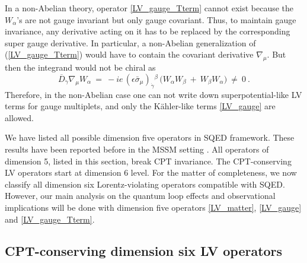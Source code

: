 \documentclass[12pt]{revtex4}
\begin{document}
In a non-Abelian theory, operator \eqref{LV_gauge_Tterm} cannot exist
because the $W_\alpha$'s are not gauge invariant but only gauge covariant.
Thus, to maintain gauge invariance, any derivative acting on it has to
be replaced by the corresponding super gauge derivative. 
In particular, a non-Abelian generalization of 
 (\ref{LV_gauge_Tterm}) would have to contain the covariant
derivative $\nabla_\mu$.  But then the integrand would not be chiral
as 
%
\begin{equation}
\overline{D}_{\dot\gamma} \nabla_\mu W_\alpha ~=~ 
-i e\, (\epsilon \bar\sigma_\mu)_{\dot\gamma}{}^\beta\, 
\Big( W_\alpha W_\beta ~+~ W_\beta W_\alpha \Big) ~\neq~ 0~. 
\end{equation} 
%
Therefore, in the non-Abelian case one can not write down
superpotential-like LV terms for gauge multiplets, and only 
the K\"ahler-like terms \eqref{LV_gauge} are allowed. 

We have listed all possible dimension five operators in SQED
framework. These results have been reported before in the MSSM setting
\cite{GrootNibbelink:2004za}. 
All operators of dimension 5, listed in this section, break CPT invariance. 
The CPT-conserving LV operators start at dimension 6 level. 
For the matter of completeness, we now classify all dimension 
six Lorentz-violating operators compatible with SQED. 
However, our main analysis on the quantum loop effects and observational 
implications will be done with dimension five
operators \eqref{LV_matter}, \eqref{LV_gauge} and \eqref{LV_gauge_Tterm}.


\subsection{CPT-conserving dimension six LV operators}
\label{Dim6}
\end{document}
